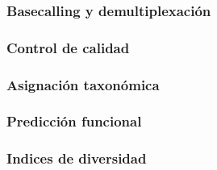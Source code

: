 \subsubsection{Basecalling y demultiplexación}
\subsubsection{Control de calidad}
\subsubsection{Asignación taxonómica}
\subsubsection{Predicción funcional}
\subsubsection{Indices de diversidad}

